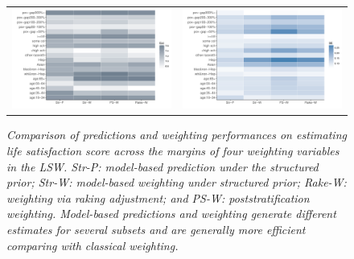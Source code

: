 \documentclass[11pt]{article}
\numberwithin{figure}{section}
\numberwithin{table}{section}
\numberwithin{equation}{section}
\begin{document}
 \begin{figure} \centering \begin{tabular}{cc}
 \includegraphics[width=.475\textwidth]{plot/lsw_mar_est.pdf}&\includegraphics[width=.475\textwidth]{plot/lsw_mar_se.pdf}
 \end{tabular} \caption{\em Comparison of predictions and weighting
 performances on estimating life satisfaction score across the margins of four
 weighting variables in the LSW. Str-P: model-based prediction under the
 structured prior; Str-W: model-based weighting under structured prior; Rake-W:
 weighting via raking adjustment; and PS-W: poststratification weighting.
 Model-based predictions and weighting generate different estimates for several
 subsets and are generally more efficient comparing with classical weighting.}
 \label{lsw-mar} \end{figure} 
\end{document}
